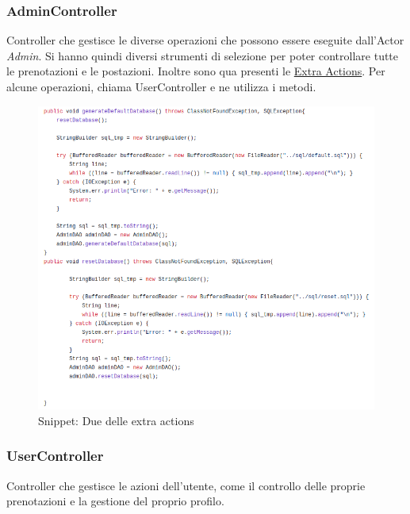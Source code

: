 \documentclass{article}
\begin{document}
{\subsubsection{AdminController}\label{subsubsec:admincontroller}
Controller che gestisce le diverse operazioni che possono essere eseguite dall'Actor \textit{Admin}. Si hanno quindi diversi strumenti di selezione per poter controllare tutte le prenotazioni e le postazioni. Inoltre sono qua presenti le \hyperref[fig:admincontrollerSnippets]{Extra Actions}. Per alcune operazioni, chiama UserController e ne utilizza i metodi.
\begin{figure}[H]
                \centering
                \includegraphics[width=\textwidth]{Images/Snippets/AdminControllerSnippets.png}
                \caption{Snippet: Due delle extra actions}
                \label{fig:admincontrollerSnippets}
            \end{figure}
\subsubsection{UserController}\label{subsubsec:usercontroller}
Controller che gestisce le azioni dell'utente, come il controllo delle proprie prenotazioni e la gestione del proprio profilo. 
}
\end{document}
